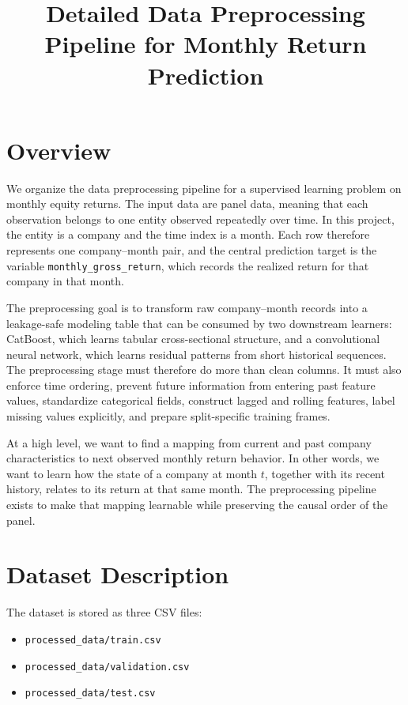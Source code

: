 \documentclass[11pt]{article}
\title{Detailed Data Preprocessing Pipeline for Monthly Return Prediction}
\author{ }
\date{ }
\begin{document}
\maketitle

\section{Overview}

We organize the data preprocessing pipeline for a supervised learning problem on monthly equity returns. The input data are panel data, meaning that each observation belongs to one entity observed repeatedly over time. In this project, the entity is a company and the time index is a month. Each row therefore represents one company--month pair, and the central prediction target is the variable \texttt{monthly\_gross\_return}, which records the realized return for that company in that month.

The preprocessing goal is to transform raw company--month records into a leakage-safe modeling table that can be consumed by two downstream learners: CatBoost, which learns tabular cross-sectional structure, and a convolutional neural network, which learns residual patterns from short historical sequences. The preprocessing stage must therefore do more than clean columns. It must also enforce time ordering, prevent future information from entering past feature values, standardize categorical fields, construct lagged and rolling features, label missing values explicitly, and prepare split-specific training frames.

At a high level, we want to find a mapping from current and past company characteristics to next observed monthly return behavior. In other words, we want to learn how the state of a company at month $t$, together with its recent history, relates to its return at that same month. The preprocessing pipeline exists to make that mapping learnable while preserving the causal order of the panel.

\section{Dataset Description}

The dataset is stored as three CSV files:
\begin{itemize}
    \item \texttt{processed\_data/train.csv}
    \item \texttt{processed\_data/validation.csv}
    \item \texttt{processed\_data/test.csv}
\end{itemize}
\end{document}
